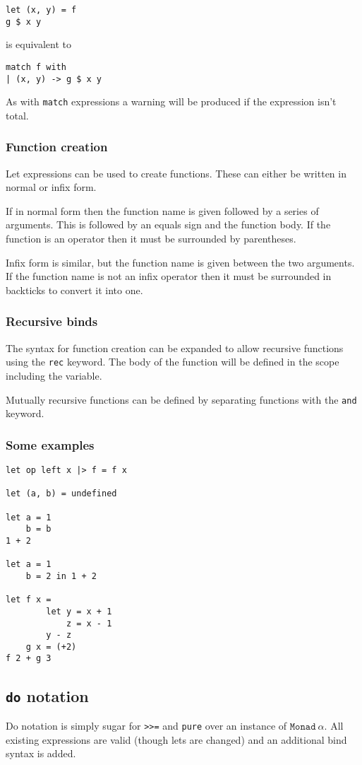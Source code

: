 \begin{verbatim}
let (x, y) = f
g $ x y
\end{verbatim}
is equivalent to
\begin{verbatim}
match f with
| (x, y) -> g $ x y
\end{verbatim}

As with \texttt{match} expressions a warning will be produced if the expression isn’t total.

\subsubsection{Function creation}
Let expressions can be used to create functions. These can either be written in normal or infix form.

If in normal form then the function name is given followed by a series of arguments. This is followed by an equals sign and the function body. If the function is an operator then it must be surrounded by parentheses.

Infix form is similar, but the function name is given between the two arguments. If the function name is not an infix operator then it must be surrounded in backticks to convert it into one.

\subsubsection{Recursive binds}
The syntax for function creation can be expanded to allow recursive functions using the \texttt{rec} keyword. The body of the function will be defined in the scope including the variable.

Mutually recursive functions can be defined by separating functions with the \texttt{and} keyword.

\subsubsection{Some examples}
\begin{verbatim}
let op left x |> f = f x

let (a, b) = undefined

let a = 1
    b = b
1 + 2

let a = 1
    b = 2 in 1 + 2
    
let f x = 
        let y = x + 1
            z = x - 1
        y - z
    g x = (+2)
f 2 + g 3
\end{verbatim}

\subsection{\texttt{do} notation}
Do notation is simply sugar for \texttt{>>=} and \texttt{pure} over an instance of $\mathtt{Monad}\ \alpha$. All existing expressions are valid (though lets are changed) and an additional bind syntax is added.

